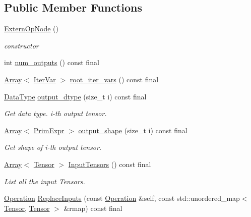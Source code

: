 \subsection*{Public Member Functions}
\begin{DoxyCompactItemize}
\item 
\hyperlink{classtvm_1_1te_1_1ExternOpNode_aa2781af3e0414490286d62ed05722e7c}{Extern\+Op\+Node} ()
\begin{DoxyCompactList}\small\item\em constructor \end{DoxyCompactList}\item 
int \hyperlink{classtvm_1_1te_1_1ExternOpNode_a1a0ce8401e57d9c66ece44dd59b3fb7d}{num\+\_\+outputs} () const final
\item 
\hyperlink{classtvm_1_1Array}{Array}$<$ \hyperlink{classtvm_1_1tir_1_1IterVar}{Iter\+Var} $>$ \hyperlink{classtvm_1_1te_1_1ExternOpNode_a4e7c08092b2941fddbc2ad5e9c9584fc}{root\+\_\+iter\+\_\+vars} () const final
\item 
\hyperlink{namespacetvm_a41918af1a1dc386388639a9d3ad06c5d}{Data\+Type} \hyperlink{classtvm_1_1te_1_1ExternOpNode_aeb736e912b0379e8e1f888ed9fcbad4f}{output\+\_\+dtype} (size\+\_\+t i) const final
\begin{DoxyCompactList}\small\item\em Get data type. i-\/th output tensor. \end{DoxyCompactList}\item 
\hyperlink{classtvm_1_1Array}{Array}$<$ \hyperlink{classtvm_1_1PrimExpr}{Prim\+Expr} $>$ \hyperlink{classtvm_1_1te_1_1ExternOpNode_a9d2a9f96da44f3a777913a76703e3dbc}{output\+\_\+shape} (size\+\_\+t i) const final
\begin{DoxyCompactList}\small\item\em Get shape of i-\/th output tensor. \end{DoxyCompactList}\item 
\hyperlink{classtvm_1_1Array}{Array}$<$ \hyperlink{classtvm_1_1te_1_1Tensor}{Tensor} $>$ \hyperlink{classtvm_1_1te_1_1ExternOpNode_ae637420eeb8dc47d6587f570d8f56eb7}{Input\+Tensors} () const final
\begin{DoxyCompactList}\small\item\em List all the input Tensors. \end{DoxyCompactList}\item 
\hyperlink{classtvm_1_1te_1_1Operation}{Operation} \hyperlink{classtvm_1_1te_1_1ExternOpNode_a24e420a11a0b08e6aa02e21732ecc3ed}{Replace\+Inputs} (const \hyperlink{classtvm_1_1te_1_1Operation}{Operation} \&self, const std\+::unordered\+\_\+map$<$ \hyperlink{classtvm_1_1te_1_1Tensor}{Tensor}, \hyperlink{classtvm_1_1te_1_1Tensor}{Tensor} $>$ \&rmap) const final

\end{DoxyCompactItemize}
